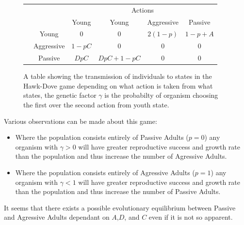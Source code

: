 \documentclass[journal,article,accept,oneauthors,pdftex,10pt,a4paper]{mdpi}
\begin{document}
\begin{figure}[H]
\begin{center}

\begin{tabular}{llllll}
\multicolumn{2}{l}{\multirow{2}{*}{}}      & \multicolumn{4}{c}{Actions}                                                                       \\
\multicolumn{2}{l|}{}                        & \multicolumn{1}{c|}{Young} & \multicolumn{1}{c|}{Young} & \multicolumn{1}{c|}{Aggressive} & \multicolumn{1}{c|}{Passive} \\ \cline{2-6} 
\multirow{3}{*}{\rotatebox[origin=c]{90}{\parbox[c]{1cm}{\centering State}}} 
                   & \multicolumn{1}{c|}{Young} & \multicolumn{1}{c|}{0}  & \multicolumn{1}{c|}{0}  & \multicolumn{1}{c|}{$2(1-p)$}  & \multicolumn{1}{c|}{$1-p+A$}  \\ \cline{2-6} 
                   & \multicolumn{1}{c|}{Aggressive} & \multicolumn{1}{c|}{$1-pC$}  & \multicolumn{1}{c|}{0}  & \multicolumn{1}{c|}{0}  & \multicolumn{1}{c|}{0}  \\ \cline{2-6} 
                   & \multicolumn{1}{c|}{Passive} & \multicolumn{1}{c|}{$DpC$}  & \multicolumn{1}{c|}{$DpC+1-pC$}  & \multicolumn{1}{c|}{0}  & \multicolumn{1}{c|}{0}  \\ \cline{2-6} 
\end{tabular}
\end{center}
\caption{A table showing the transmission of individuals to states in the Hawk-Dove game depending on what action is taken from what states, the genetic factor $\gamma$ is the probabilty of organism choosing the first over the second action from youth state.}
\end{figure}
Various observations can be made about this game: 
\begin{itemize}[leftmargin=*,labelsep=4mm]
\item	Where the population consists entirely of Passive Adults ($p=0$) any organism with $\gamma>0$ will have greater reproductive success and growth rate than the population and thus increase the number of Agressive Adults.
\item	Where the population consists entirely of Agressive Adults ($p=1$) any organism with $\gamma<1$ will have greater reproductive success and growth rate than the population and thus increase the number of Passive Adults.
\end{itemize}
It seems that there exists a possible evolutionary equilibrium between Passive and Agressive Adults dependant on $A$,$D$, and $C$ even if it is not so apparent.
\end{document}
